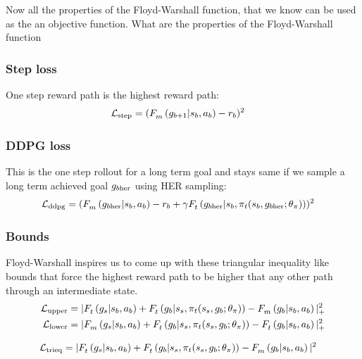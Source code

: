 Now all the properties of the Floyd-Warshall function, that we know can be used
as the an objective function.
What are the properties of the Floyd-Warshall
function

\subsubsection{Step loss}
One step reward path is the highest reward path:
\begin{align}
      \Loss_{\text{step}} &= (\fwargs{\state_{b}}{\act_{b}}{\goal_{b+1}}{m}{} - \rew_b)^2
\end{align}
%

\subsubsection{DDPG loss}
This is the one step rollout for a long term goal and stays same if we sample a
long term achieved goal $\goal_{b\text{her}}$ using HER sampling:
\begin{align}
  \Loss_{\text{ddpg}} &= (\fwargs{\state_{b}}{\act_{b}}{\goal_{b\text{her}}}{m}{} -
      \rew_b + \discount\fwargs{\state_{b}}{\policy_t(\state_b, \goal_{b\text{her}};\param_\policy)}{\goal_{b\text{her}}}{t}{})^2
\end{align}
%

\subsubsection{Bounds}
Floyd-Warshall inspires us to come up with these triangular inequality like
bounds that force the highest reward path to be higher that any other path
through an intermediate state.
%
\begin{align}
  \Loss_{\text{upper}} &= |
      \fwargs{\state_{b}}{\act_b}{\goal_s}{t}{}
      + \fwargs{\state_{s}}{\policy_t(\state_s, \goal_{b};\param_\policy)}{\goal_b}{t}{}
      - \fwargs{\state_{b}}{\act_b}{\goal_b}{m}{}
      |_+^2
                         \\
  \Loss_{\text{lower}} &= |
      \fwargs{\state_{b}}{\act_b}{\goal_s}{m}{}
      + \fwargs{\state_{s}}{\policy_t(\state_s, \goal_{b};\param_\policy)}{\goal_b}{t}{}
      - \fwargs{\state_{b}}{\act_b}{\goal_b}{t}{}
      |_+^2
\end{align}%
% 

\begin{align}
  \Loss_{\text{trieq}} &= |
      \fwargs{\state_{b}}{\act_b}{\goal_s}{t}{}
      + \fwargs{\state_{s}}{\policy_t(\state_s, \goal_{b};\param_\policy)}{\goal_b}{t}{}
      - \fwargs{\state_{b}}{\act_b}{\goal_b}{m}{}
      |^2
\end{align}

